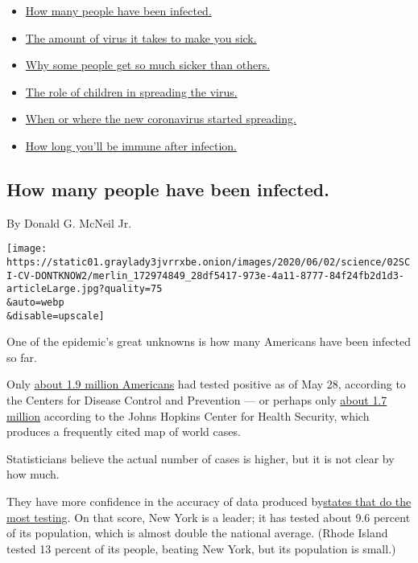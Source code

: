\begin{itemize}
\tightlist
\item
  \protect\hyperlink{link-3972962}{How many people have been infected.}
\item
  \protect\hyperlink{link-187ea3c}{The amount of virus it takes to make
  you sick.}
\item
  \protect\hyperlink{link-6983205a}{Why some people get so much sicker
  than others.}
\item
  \protect\hyperlink{link-7d05573}{The role of children in spreading the
  virus.}
\item
  \protect\hyperlink{link-1d483e4d}{When or where the new coronavirus
  started spreading.}
\item
  \protect\hyperlink{link-605f4b38}{How long you'll be immune after
  infection.}
\end{itemize}

\hypertarget{how-many-people-have-been-infected}{%
\subsection{How many people have been
infected.}\label{how-many-people-have-been-infected}}

By Donald G. McNeil Jr.

\texttt{[image: https://static01.graylady3jvrrxbe.onion/images/2020/06/02/science/02SCI-CV-DONTKNOW2/merlin\_172974849\_28df5417-973e-4a11-8777-84f24fb2d1d3-articleLarge.jpg?quality=75\\\&auto=webp\\\&disable=upscale]}

One of the epidemic's great unknowns is how many Americans have been
infected so far.

Only
\href{https://www.cdc.gov/coronavirus/2019-ncov/cases-updates/testing-in-us.html}{about
1.9 million Americans} had tested positive as of May 28, according to
the Centers for Disease Control and Prevention --- or perhaps only
\href{https://coronavirus.jhu.edu/map.html}{about 1.7 million} according
to the Johns Hopkins Center for Health Security, which produces a
frequently cited map of world cases.

Statisticians believe the actual number of cases is higher, but it is
not clear by how much.

They have more confidence in the accuracy of data produced
by\href{https://www.worldometers.info/coronavirus/country/us/}{states
that do the most testing}. On that score, New York is a leader; it has
tested about 9.6 percent of its population, which is almost double the
national average. (Rhode Island tested 13 percent of its people, beating
New York, but its population is small.)

